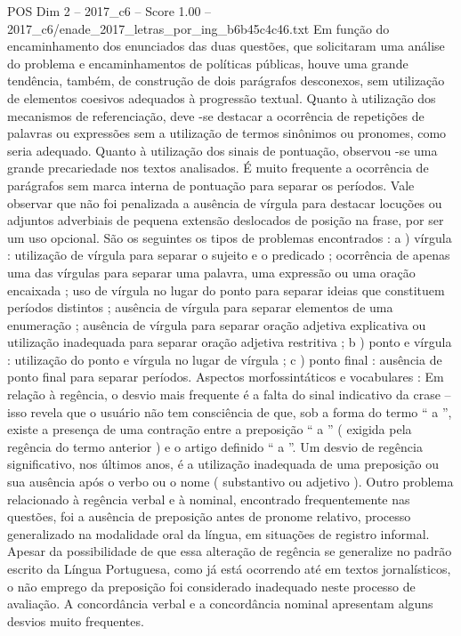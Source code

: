 \begin{textsample}{POS Dim 2 – 2017\_c6 – Score 1.00 – 2017\_c6/enade\_2017\_letras\_por\_ing\_b6b45c4c46.txt}
Em função do encaminhamento dos enunciados das duas questões, que solicitaram uma análise do problema e encaminhamentos de políticas públicas, houve uma grande tendência, também, de construção de dois parágrafos desconexos, sem utilização de elementos coesivos adequados à progressão textual.
Quanto à utilização dos mecanismos de referenciação, deve -se destacar a ocorrência de repetições de palavras ou expressões sem a utilização de termos sinônimos ou pronomes, como seria adequado.
Quanto à utilização dos sinais de pontuação, observou -se uma grande precariedade nos textos analisados.
É muito frequente a ocorrência de parágrafos sem marca interna de pontuação para separar os períodos.
Vale observar que não foi penalizada a ausência de vírgula para destacar locuções ou adjuntos adverbiais de pequena extensão deslocados de posição na frase, por ser um uso opcional.
São os seguintes os tipos de problemas encontrados : a ) vírgula : utilização de vírgula para separar o sujeito e o predicado ; ocorrência de apenas uma das vírgulas para separar uma palavra, uma expressão ou uma oração encaixada ; uso de vírgula no lugar do ponto para separar ideias que constituem períodos distintos ; ausência de vírgula para separar elementos de uma enumeração ; ausência de vírgula para separar oração adjetiva explicativa ou utilização inadequada para separar oração adjetiva restritiva ; b ) ponto e vírgula : utilização do ponto e vírgula no lugar de vírgula ; c ) ponto final : ausência de ponto final para separar períodos.
Aspectos morfossintáticos e vocabulares : Em relação à regência, o desvio mais frequente é a falta do sinal indicativo da crase – isso revela que o usuário não tem consciência de que, sob a forma do termo “ a ”, existe a presença de uma contração entre a preposição “ a ” ( exigida pela regência do termo anterior ) e o artigo definido “ a ”.
Um desvio de regência significativo, nos últimos anos, é a utilização inadequada de uma preposição ou sua ausência após o verbo ou o nome ( substantivo ou adjetivo ).
Outro problema relacionado à regência verbal e à nominal, encontrado frequentemente nas questões, foi a ausência de preposição antes de pronome relativo, processo generalizado na modalidade oral da língua, em situações de registro informal.
Apesar da possibilidade de que essa alteração de regência se generalize no padrão escrito da Língua Portuguesa, como já está ocorrendo até em textos jornalísticos, o não emprego da preposição foi considerado inadequado neste processo de avaliação.
A concordância verbal e a concordância nominal apresentam alguns desvios muito frequentes.

\end{textsample}
